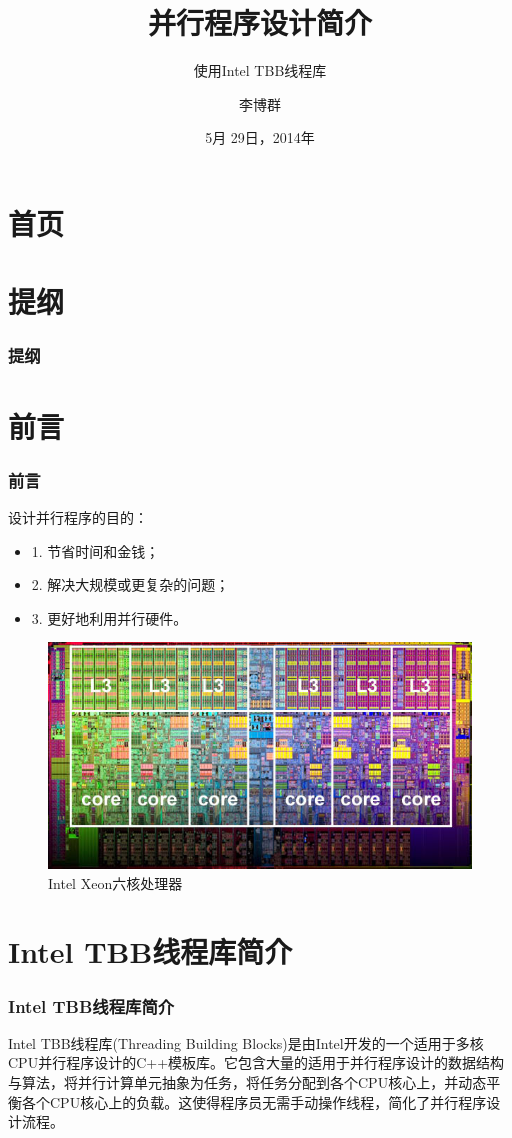 \documentclass[hyperref={unicode},13pt,a4paper]{beamer}
\title[并行程序设计简介]{并行程序设计简介}
\subtitle[sub]{使用Intel TBB线程库}
\author[李博群]{李博群}
\institute[SZU]{
  深圳大学，计算数学\\[1ex]
  \texttt{a14331990@163.com}
}
\date[5月 29日]{5月 29日，2014年}
\begin{document}
\begin{CJK*}{UTF8}{song}

\section{首页}
\begin{frame}[plain]
	\titlepage
\end{frame}

\section{提纲}
\begin{frame}
    \frametitle{提纲}
	\tableofcontents
\end{frame}

\section{前言}
\begin{frame}
	\frametitle{前言}
	设计并行程序的目的：
	\begin{itemize}
	\item 1. 节省时间和金钱；
	\item 2. 解决大规模或更复杂的问题；
	\item 3. 更好地利用并行硬件。
	\end{itemize}
	\begin{figure}
	\centering
	\includegraphics[width=0.8\linewidth]{intel_xeon_many_cores}
	\caption[Intel Xeon六核处理器]{Intel Xeon六核处理器} 
	\label{fig:intel_xeon_many_cores}
	\end{figure}
\end{frame}

\section{Intel TBB线程库简介}
\begin{frame}
	\frametitle{Intel TBB线程库简介}
	Intel TBB线程库(Threading Building Blocks)是由Intel开发的一个适用于多核CPU并行程序设计的C++模板库。它包含大量的适用于并行程序设计的数据结构与算法，将并行计算单元抽象为任务，将任务分配到各个CPU核心上，并动态平衡各个CPU核心上的负载。这使得程序员无需手动操作线程，简化了并行程序设计流程。
\end{frame}


\end{CJK*}
\end{document}
